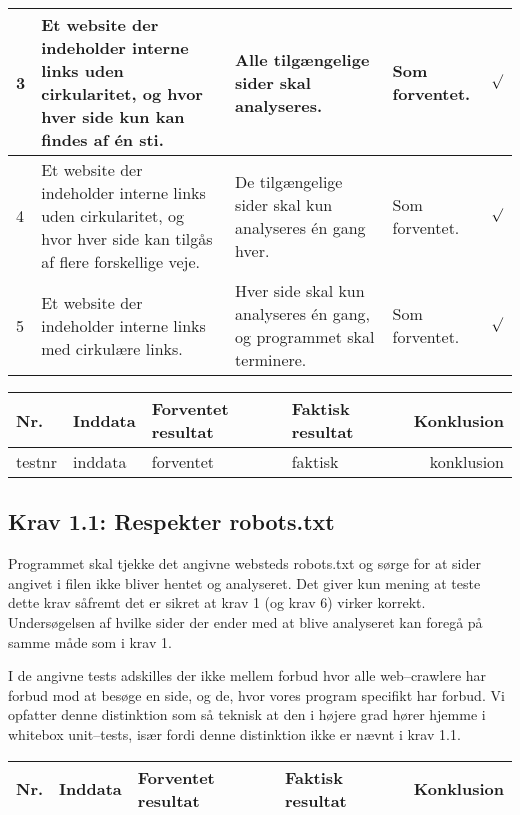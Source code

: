 \documentclass[a4paper,oneside,article]{memoir}
\begin{document}
\begin{landscape}
\begin{longtable}[c]{p{20pt}|p{220pt}|p{130pt}|p{130pt}|r}
3 &
Et website der indeholder interne links uden cirkularitet, og
hvor hver side kun kan findes af én sti. &
Alle tilgængelige sider skal analyseres. &
Som forventet. &
$\surd$ \\ \hline

4 &
Et website der indeholder interne links uden cirkularitet, og hvor
hver side kan tilgås af flere forskellige veje. &
De tilgængelige sider skal kun analyseres én gang hver. &
Som forventet. &
$\surd$ \\ \hline

5 &
Et website der indeholder interne links med cirkulære links. &
Hver side skal kun analyseres én gang, og programmet skal
terminere. &
Som forventet. &
$\surd$

\end{longtable}

\begin{longtable}[c]{p{20pt}|p{220pt}|p{130pt}|p{130pt}|r}
\textbf{Nr.} &
\textbf{Inddata} &
\textbf{Forventet resultat} &
\textbf{Faktisk resultat} &
\textbf{Konklusion} \\ \hline

testnr &
inddata &
forventet &
faktisk &
konklusion \\ \hline
\end{longtable}

\subsection{Krav 1.1: Respekter robots.txt}

Programmet skal tjekke det angivne websteds robots.txt og sørge for at
sider angivet i filen ikke bliver hentet og analyseret. Det giver kun
mening at teste dette krav såfremt det er sikret at krav 1 (og krav 6)
virker korrekt. Undersøgelsen af hvilke sider der ender med at blive
analyseret kan foregå på samme måde som i krav 1.

I de angivne tests adskilles der ikke mellem forbud hvor alle
web--crawlere har forbud mod at besøge en side, og de, hvor vores
program specifikt har forbud. Vi opfatter denne distinktion som så
teknisk at den i højere grad hører hjemme i whitebox unit--tests, især
fordi denne distinktion ikke er nævnt i krav 1.1.

\begin{longtable}[c]{p{20pt}|p{220pt}|p{130pt}|p{130pt}|r}
\textbf{Nr.} &
\textbf{Inddata} &
\textbf{Forventet resultat} &
\textbf{Faktisk resultat} &
\textbf{Konklusion} \\ \hline


\end{longtable}
\end{landscape}
\end{document}
